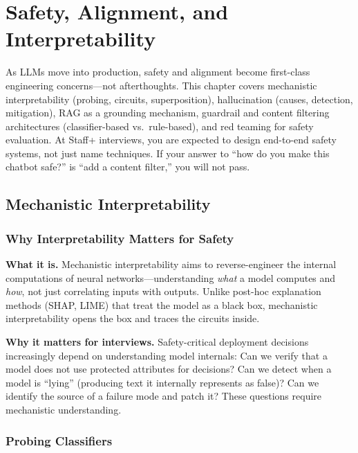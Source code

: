 \chapter{Safety, Alignment, and Interpretability}
\label{chap:safety_alignment}

\begin{tldr}
As LLMs move into production, safety and alignment become first-class engineering concerns---not afterthoughts. This chapter covers mechanistic interpretability (probing, circuits, superposition), hallucination (causes, detection, mitigation), RAG as a grounding mechanism, guardrail and content filtering architectures (classifier-based vs.\ rule-based), and red teaming for safety evaluation. At Staff+ interviews, you are expected to design end-to-end safety systems, not just name techniques. If your answer to ``how do you make this chatbot safe?'' is ``add a content filter,'' you will not pass.
\end{tldr}

\section{Mechanistic Interpretability}
\label{sec:mechanistic_interp}

\subsection{Why Interpretability Matters for Safety}

\textbf{What it is.} Mechanistic interpretability aims to reverse-engineer the internal computations of neural networks---understanding \textit{what} a model computes and \textit{how}, not just correlating inputs with outputs. Unlike post-hoc explanation methods (SHAP, LIME) that treat the model as a black box, mechanistic interpretability opens the box and traces the circuits inside.

\textbf{Why it matters for interviews.} Safety-critical deployment decisions increasingly depend on understanding model internals: Can we verify that a model does not use protected attributes for decisions? Can we detect when a model is ``lying'' (producing text it internally represents as false)? Can we identify the source of a failure mode and patch it? These questions require mechanistic understanding.

\subsection{Probing Classifiers}

